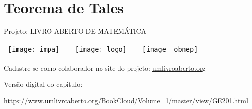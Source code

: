 
\ifnum{}
\renewcommand\chapterillustration{abertura-tales}
\else
\renewcommand\chapterillustration{abertura-tales-professor}
\fi
\renewcommand\chapterwhat{São estudados o significado de um teorema
com sua hipótese e tese, o Teorema de Tales, sua recíproca, as projeções paralelas e aplicações.}
\renewcommand\chapterbecause{O capítulo contém uma ferramenta útil para resolver situações que envolvem retas paralelas. Além disso, o teorema de Tales será usado para para desenvolver o conceito de semelhança de triângulos, que é um dos instrumentos necessários para compreender o mundo real. A semelhança, por sua vez, permite a obtenção de diversas propriedades métricas das figuras geométricas, tanto planas como espaciais.}


\chapter{Teorema de Tales}



\mbox{}\thispagestyle{empty}\clearpage

\thispagestyle{empty}

\begin{center}
Projeto: LIVRO ABERTO DE MATEMÁTICA

\noindent \begin{tabular}{lcccr}
\texttt{[image: impa]}& \quad\quad& \texttt{[image: logo]} & \quad\quad& \texttt{[image: obmep]} 
\end{tabular}
\end{center}

\vspace*{.3cm}

Cadastre-se como colaborador no site do projeto: \url{umlivroaberto.org}

Versão digital do capítulo:

\url{https://www.umlivroaberto.org/BookCloud/Volume_1/master/view/GE201.html}


